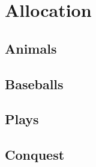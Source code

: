 \chapter{Allocation}





\section{Animals}





\begin{questions}


\end{questions}




\begin{questions}

\end{questions}

\section{Baseballs}






\begin{questions}

\end{questions}


\section{Plays}





\begin{questions}

\end{questions}

\section{Conquest}


